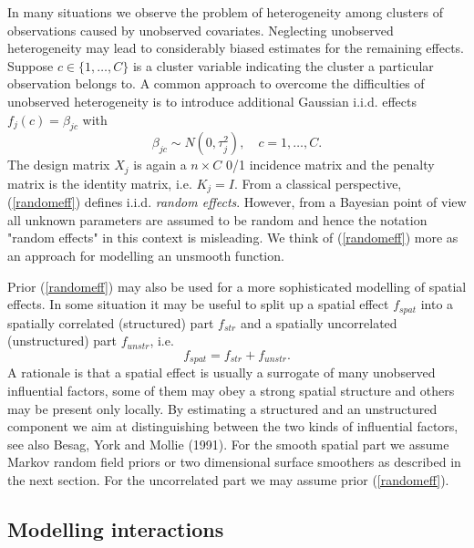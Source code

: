 In many situations we observe the problem of heterogeneity among
clusters of observations caused by unobserved covariates.
Neglecting unobserved heterogeneity may lead to considerably
biased estimates for the remaining effects. Suppose $c \in
\{1,\dots,C\}$ is a cluster variable indicating the cluster a
particular observation belongs to. A common approach to overcome
the difficulties of unobserved heterogeneity is to introduce
additional Gaussian i.i.d. effects $f_j(c) = \beta_{jc}$ with
\begin{equation}
\label{randomeff} \beta_{jc} \sim N(0,\tau_j^2), \quad
c=1,\dots,C.
\end{equation}
The design matrix $X_j$ is again a $n \times C$ 0/1 incidence
matrix and the penalty matrix is the identity matrix, i.e.
$K_j=I$. From a classical perspective, (\ref{randomeff}) defines
i.i.d. {\em random effects}. However, from a Bayesian point of
view all unknown parameters are assumed to be random and hence the
notation "random effects" in this context is misleading. We think
of (\ref{randomeff}) more as an approach for modelling an unsmooth
function.

Prior (\ref{randomeff}) may also be used for a more sophisticated
modelling of spatial effects. In some situation it may be useful
to split up a spatial effect $f_{spat}$ into a spatially
correlated (structured) part $f_{str}$ and a spatially
uncorrelated (unstructured) part $f_{unstr}$, i.e.
$$
f_{spat} = f_{str}+f_{unstr}.
$$
A rationale is that a spatial effect is usually a surrogate of
many unobserved influential factors, some of them may obey a
strong spatial structure and others may be present only locally.
By estimating a structured and an unstructured component we aim at
distinguishing between the two kinds of influential factors, see
also Besag, York and Mollie (1991). For the smooth spatial part we
assume Markov random field priors or two dimensional surface
smoothers as described in the next section. For the uncorrelated
part we may assume prior (\ref{randomeff}).

\subsection{Modelling interactions}
\label{interactions}

